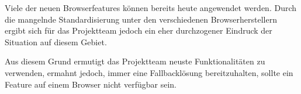 Viele der neuen Browserfeatures können bereits heute angewendet werden. Durch die mangelnde Standardisierung unter den verschiedenen Browserherstellern ergibt sich für das Projektteam jedoch ein eher durchzogener Eindruck der Situation auf diesem Gebiet.

Aus diesem Grund ermutigt das Projektteam neuste Funktionalitäten zu verwenden, ermahnt jedoch, immer eine Fallbacklösung bereitzuhalten, sollte ein Feature auf einem Browser nicht verfügbar sein.
